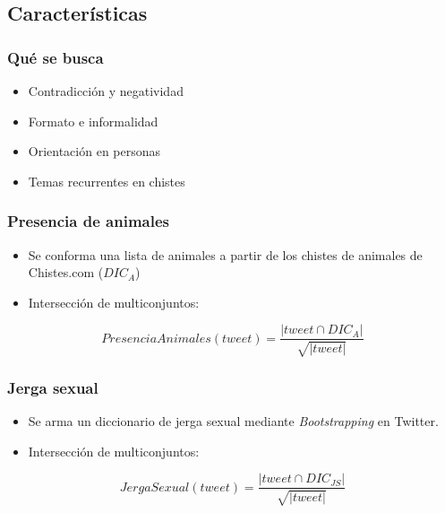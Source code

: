\subsection{Características}

\begin{frame}
    \frametitle{Qué se busca}

    \begin{itemize}[<+->]
        \item Contradicción y negatividad
        \item Formato e informalidad
        \item Orientación en personas
        \item Temas recurrentes en chistes
    \end{itemize}
\end{frame}

\begin{frame}
    \frametitle{Presencia de animales}

    \begin{itemize}
        \item Se conforma una lista de animales a partir de los chistes de animales de Chistes.com ($DIC_A$)
        \item Intersección de multiconjuntos:
    \end{itemize}

    \begin{center}
        \[
            PresenciaAnimales(tweet) = \frac{|tweet \cap DIC_A|}{\sqrt{|tweet|}}
        \]
    \end{center}
\end{frame}

\begin{frame}
    \frametitle{Jerga sexual}

    \begin{itemize}
        \item Se arma un diccionario de jerga sexual mediante \emph{Bootstrapping} en Twitter.
        \item Intersección de multiconjuntos:
    \end{itemize}

    \begin{center}
        \[
            JergaSexual(tweet) = \frac{|tweet \cap DIC_{JS}|}{\sqrt{|tweet|}}
        \]
    \end{center}
\end{frame}

